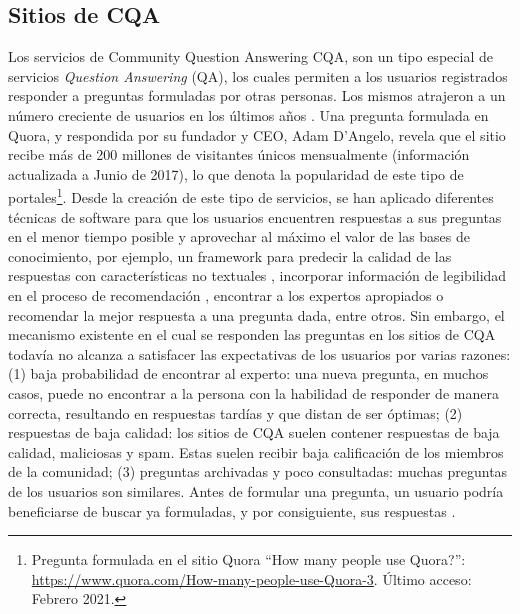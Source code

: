 \subsection{Sitios de CQA}
Los servicios de Community Question Answering CQA, son un tipo especial de servicios \textit{Question Answering} (QA), los cuales permiten a los usuarios registrados responder a preguntas formuladas por otras personas. Los mismos atrajeron a un número creciente de usuarios en los últimos años \citep{li2010routing}. Una pregunta formulada en Quora, y respondida por su fundador y CEO, Adam D'Angelo, revela que el sitio recibe más de 200 millones de visitantes únicos mensualmente (información actualizada a Junio de 2017), lo que denota la popularidad de este tipo de portales\footnote{Pregunta formulada en el sitio Quora “How many people use Quora?”: \url{https://www.quora.com/How-many-people-use-Quora-3}. Último acceso: Febrero 2021.}. Desde la creación de este tipo de servicios, se han aplicado diferentes técnicas de software para que los usuarios encuentren respuestas a sus preguntas en el menor tiempo posible y aprovechar al máximo el valor de las bases de conocimiento, por ejemplo, un framework para predecir la calidad de las respuestas con características no textuales \citep{jeon2006framework}, incorporar información de legibilidad en el proceso de recomendación \citep{anuyah2017can}, encontrar a los expertos apropiados \citep{li2010routing} o recomendar la mejor respuesta a una pregunta dada, entre otros. Sin embargo, el mecanismo existente en el cual se responden las preguntas en los sitios de CQA todavía no alcanza a satisfacer las expectativas de los usuarios por varias razones: (1) baja probabilidad de encontrar al experto: una nueva pregunta, en muchos casos, puede no encontrar a la persona con la habilidad de responder de manera correcta, resultando en respuestas tardías y que distan de ser óptimas; (2) respuestas de baja calidad: los sitios de CQA suelen contener respuestas de baja calidad, maliciosas y spam. Estas suelen recibir baja calificación de los miembros de la comunidad; (3) preguntas archivadas y poco consultadas: muchas preguntas de los usuarios son similares. Antes de formular una pregunta, un usuario podría beneficiarse de buscar ya formuladas, y por consiguiente, sus respuestas \citep{yang2013cqarank}.
